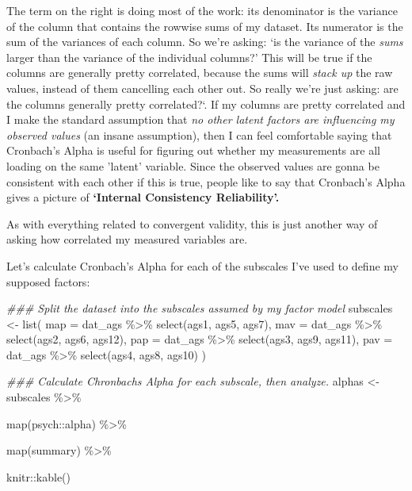 \documentclass[
  letterpaper,
  DIV=11,
  numbers=noendperiod]{scrreprt}
\newenvironment{Shaded}{\begin{snugshade}}{\end{snugshade}}
\newcommand{\AttributeTok}[1]{\textcolor[rgb]{0.40,0.45,0.13}{#1}}
\newcommand{\DocumentationTok}[1]{\textcolor[rgb]{0.37,0.37,0.37}{\textit{#1}}}
\newcommand{\FunctionTok}[1]{\textcolor[rgb]{0.28,0.35,0.67}{#1}}
\newcommand{\NormalTok}[1]{\textcolor[rgb]{0.00,0.23,0.31}{#1}}
\newcommand{\OtherTok}[1]{\textcolor[rgb]{0.00,0.23,0.31}{#1}}
\newcommand{\SpecialCharTok}[1]{\textcolor[rgb]{0.37,0.37,0.37}{#1}}
\begin{document}
The term on the right is doing most of the work: its denominator is the
variance of the column that contains the rowwise sums of my dataset. Its
numerator is the sum of the variances of each column. So we're asking:
`is the variance of the \emph{sums} larger than the variance of the
individual columns?' This will be true if the columns are generally
pretty correlated, because the sums will \emph{stack up} the raw values,
instead of them cancelling each other out. So really we're just asking:
are the columns generally pretty correlated?`. If my columns are pretty
correlated and I make the standard assumption that \emph{no other latent
factors are influencing my observed values} (an insane assumption), then
I can feel comfortable saying that Cronbach's Alpha is useful for
figuring out whether my measurements are all loading on the same
'latent' variable. Since the observed values are gonna be consistent
with each other if this is true, people like to say that Cronbach's
Alpha gives a picture of \textbf{`Internal Consistency Reliability'.}

As with everything related to convergent validity, this is just another
way of asking how correlated my measured variables are.

Let's calculate Cronbach's Alpha for each of the subscales I've used to
define my supposed factors:

\begin{Shaded}
\begin{Highlighting}[]
\DocumentationTok{\#\#\# Split the dataset into the subscales assumed by my factor model}
\NormalTok{subscales }\OtherTok{\textless{}{-}} \FunctionTok{list}\NormalTok{(}
  \AttributeTok{map =}\NormalTok{ dat\_ags }\SpecialCharTok{\%\textgreater{}\%} \FunctionTok{select}\NormalTok{(ags1, ags5, ags7),}
  \AttributeTok{mav =}\NormalTok{ dat\_ags }\SpecialCharTok{\%\textgreater{}\%} \FunctionTok{select}\NormalTok{(ags2, ags6, ags12),}
  \AttributeTok{pap =}\NormalTok{ dat\_ags }\SpecialCharTok{\%\textgreater{}\%} \FunctionTok{select}\NormalTok{(ags3, ags9, ags11),}
  \AttributeTok{pav =}\NormalTok{ dat\_ags }\SpecialCharTok{\%\textgreater{}\%} \FunctionTok{select}\NormalTok{(ags4, ags8, ags10)}
\NormalTok{)}

\DocumentationTok{\#\#\# Calculate Chronbach\textquotesingle{}s Alpha for each subscale, then analyze.}
\NormalTok{alphas }\OtherTok{\textless{}{-}}\NormalTok{ subscales }\SpecialCharTok{\%\textgreater{}\%} 
  
  \FunctionTok{map}\NormalTok{(psych}\SpecialCharTok{::}\NormalTok{alpha) }\SpecialCharTok{\%\textgreater{}\%} 
  
  \FunctionTok{map}\NormalTok{(summary) }\SpecialCharTok{\%\textgreater{}\%} 
  
\NormalTok{  knitr}\SpecialCharTok{::}\FunctionTok{kable}\NormalTok{() }
\end{Highlighting}
\end{Shaded}
\end{document}

